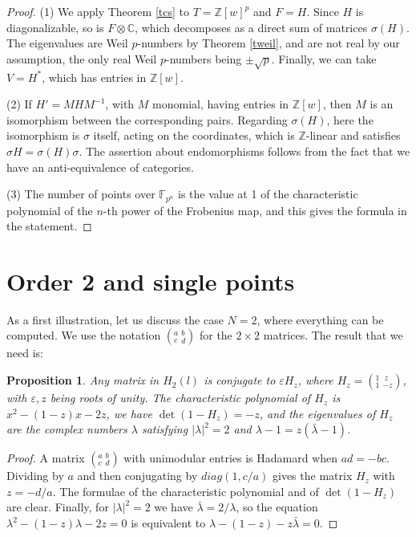 \documentclass[11pt]{amsart}
\newtheorem{proposition}[theorem]{Proposition}
\theoremstyle{definition}
\begin{document}
\begin{proof}
(1) We apply Theorem \ref{tcs} to $T=\mathbb Z[w]^p$ and $F=H$. Since $H$ is diagonalizable, so is $F\otimes\mathbb C$, which decomposes as a direct sum of matrices $\sigma(H)$. The eigenvalues are Weil $p$-numbers by Theorem \ref{tweil}, and are not real by our assumption, the only real Weil $p$-numbers being $\pm\sqrt{p}$. Finally, we can take $V=H^*$, which has entries in $\mathbb Z[w]$.

\medskip

(2) If $H'=MHM^{-1}$, with $M$ monomial, having entries in $\mathbb Z[w]$, then $M$ is an isomorphism between the corresponding pairs. Regarding $\sigma(H)$, here the isomorphism is $\sigma$ itself, acting on the coordinates, which is $\mathbb Z$-linear and satisfies $\sigma H=\sigma(H)\sigma$. The assertion about endomorphisms follows from the fact that we have an anti-equivalence of categories.

\medskip

(3) The number of points over $\mathbb F_{p^n}$ is the value at 1 of the characteristic polynomial of the $n$-th power of the Frobenius map, and this gives the formula in the statement.
\end{proof}

\section{Order 2 and single points}

As a first illustration, let us discuss the case $N=2$, where everything can be computed. We use the notation $(^a_c{\ }^b_d)$ for the $2\times2$ matrices. The result that we need is:

\begin{proposition}\label{ptwo}
Any matrix in $H_2(l)$ is conjugate to $\varepsilon H_z$, where $H_z=(^1_1{\ }^{\ z}_{-z})$, with $\varepsilon,z$ being roots of unity. The characteristic polynomial of $H_z$ is $x^2-(1-z)x-2z$, we have $\det(1-H_z)=-z$, and the eigenvalues of $H_z$ are the complex numbers $\lambda$ satisfying $|\lambda|^2=2$ and $\lambda-1=z(\bar{\lambda}-1)$.
\end{proposition}

\begin{proof}
A matrix $(^a_c{\ }^b_d)$ with unimodular entries is Hadamard when $ad=-bc$. Dividing by $a$ and then conjugating by $diag(1,c/a)$ gives the matrix $H_z$ with $z=-d/a$. The formulae of the characteristic polynomial and of $\det(1-H_z)$ are clear. Finally, for $|\lambda|^2=2$ we have $\bar{\lambda}=2/\lambda$, so the equation $\lambda^2-(1-z)\lambda-2z=0$ is equivalent to $\lambda-(1-z)-z\bar{\lambda}=0$.
\end{proof}
\end{document}
